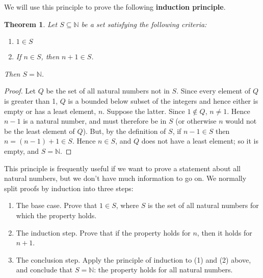 \documentclass[a4paper,leqno]{article}
\numberwithin{equation}{section}
\newtheorem{thm}[equation]{Theorem}
\theoremstyle{definition}
\theoremstyle{remark}
\newcommand{\df}[1]{\textbf{#1}}
\begin{document}
We will use this principle to prove the following \df{induction principle}.
\begin{thm}
  Let $ S \subseteq \mathbb{N} $ be a set satisfying the following criteria:
  \begin{enumerate}
    \item $ 1 \in S $
    \item If $ n \in S $, then $ n + 1 \in S $.
  \end{enumerate}
  Then $ S = \mathbb{N} $.
\end{thm}
\begin{proof}
  Let $ Q $ be the set of all natural numbers not in $ S $. Since every element of $ Q $ is greater than 1, $ Q $ is a bounded below subset of the
  integers and hence either is empty or has a least element, $ n $. Suppose the latter. Since $ 1 \notin Q $, $ n \neq 1 $. Hence $ n - 1 $ is a
  natural number, and must therefore be in $ S $ (or otherwise $ n $ would not be the least element of $ Q $). But, by the definition of $ S $,
  if $ n - 1 \in S $ then $ n = (n - 1) + 1 \in S $. Hence $ n \in S $, and $ Q $ does not have a least element; so it is empty, and $ S = \mathbb{N} $.
\end{proof}

This principle is frequently useful if we want to prove a statement about all natural numbers, but we don't have much information
to go on. We normally split proofs by induction into three steps:
\begin{enumerate}
  \item The base case. Prove that $ 1 \in S $, where $ S $ is the set of all natural numbers for which the property holds.
  \item The induction step. Prove that if the property holds for $ n $, then it holds for $ n + 1 $.
  \item The conclusion step. Apply the principle of induction to (1) and (2) above, and conclude that $ S = \mathbb{N} $: the property holds for all natural numbers.
\end{enumerate}
\end{document}

